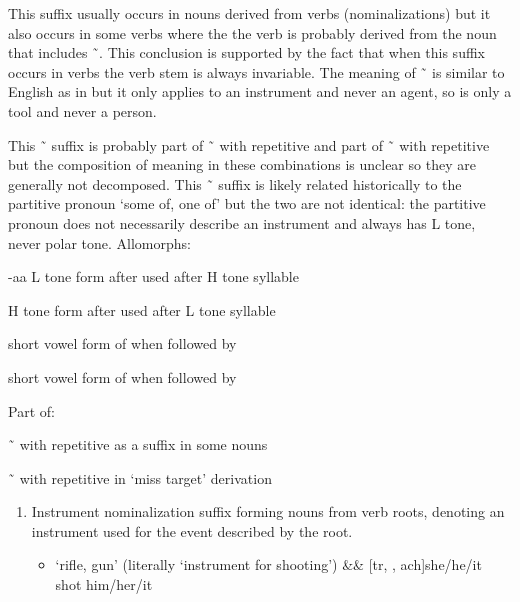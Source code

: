 \begin{morphdesc}[series=alphalist]
	This suffix usually occurs in nouns derived from verbs (nominalizations)
		but it also occurs in some verbs where the the verb is probably
		derived from the noun that includes  \~\ .
	This conclusion is supported by the fact that when this suffix occurs in verbs
		the verb stem is always invariable.
	The meaning of  \~\  is similar to English  as in 
		but it only applies to an instrument and never an agent,
		so  is only a tool and never a person.

	This  \~\  suffix is probably
		part of  \~\  with repetitive 
		and part of  \~\  with repetitive 
		but the composition of meaning in these combinations is unclear
		so they are generally not decomposed.
	This  \~\  suffix is likely related historically
		to the partitive pronoun  ‘some of, one of’
		but the two are not identical:
		the partitive pronoun  does not necessarily describe an instrument
		and always has L tone, never polar tone.
	\newline
	Allomorphs:
	\begin{allolist}
	\item[-aa]	L tone form after used after H tone syllable
	\item[\X{-áa}]	H tone form after used after L tone syllable
	\item[\X{-a}]	short vowel form of  when followed by 
	\item[\X{-á}]	short vowel form of  when followed by 
	\end{allolist}
	Part of:
	\begin{allolist}
	\item[\X{-jaa} \~\ \X{-jáa}]
			with repetitive  as a suffix in some nouns
	\item[\X{-x̱aa} \~\ \X{-x̱áa}]
			with repetitive  in ‘miss target’ derivation
	\end{allolist}
	\begin{enumerate}
	\item	Instrument nominalization suffix forming nouns from verb roots,
			denoting an instrument used for the event described by the root.
		\begin{itemize}
		\item	{} ‘rifle, gun’ (literally ‘instrument for shooting’)
					{&\·\xx{var}&\·}
			\versus {}[tr, , ach]{she/he/it shot him/her/it}

\end{itemize}
\end{enumerate}
\end{morphdesc}
